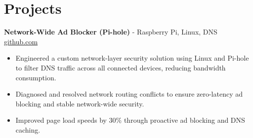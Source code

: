 \documentclass[11pt]{article}       %
\begin{document}

\vspace{-18.5pt}

\section*{Projects}

\textbf{Network-Wide Ad Blocker (Pi-hole)}{ - Raspberry Pi, Linux, DNS} \hfill \href{https://github.com/Monica20030707}{github.com} \\
\vspace{-9pt}
\begin{itemize}
  \item Engineered a custom network-layer security solution using Linux and Pi-hole to filter DNS traffic across all connected devices, reducing bandwidth consumption.
  \item Diagnosed and resolved network routing conflicts to ensure zero-latency ad blocking and stable network-wide security.
  \item Improved page load speeds by 30\% through proactive ad blocking and DNS caching.
\end{itemize}

\end{document}
